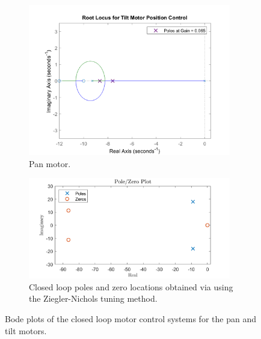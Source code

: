 \documentclass[../../main.tex]{subfiles}
\begin{document}
\begin{figure}[h]
\begin{subfigure}{0.48\textwidth}
    \includegraphics[width = 0.97\textwidth]{Sections/System_Design/Images/RL_TiltMotorVelPolePlace.png}
    \caption{Pan motor.}
    \label{fig:vel_root_locus}
\end{subfigure}\quad
\begin{subfigure}{0.48\textwidth}
    \includegraphics[width = 0.97\textwidth]{Sections/System_Design/Images/PoleZero_TiltMotorVel_NZ.png}
    \caption{Closed loop poles and zero locations obtained via using the Ziegler-Nichols tuning method.}
    \label{fig:ZN_pole_zero}
\end{subfigure}
\caption{Bode plots of the closed loop motor control systems for the pan and tilt motors.}
\label{fig:vel_poles_zeros}
\end{figure}
\end{document}
